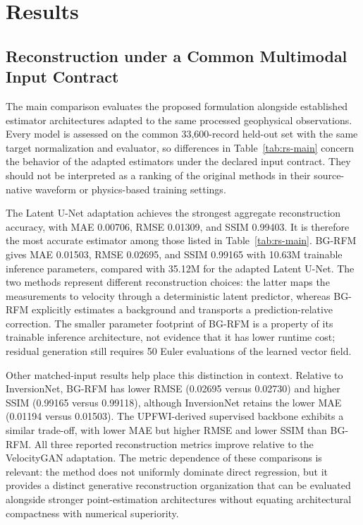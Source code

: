 \section{Results}

\subsection{Reconstruction under a Common Multimodal Input Contract}

The main comparison evaluates the proposed formulation alongside established estimator architectures adapted to the same processed geophysical observations. Every model is assessed on the common 33,600-record held-out set with the same target normalization and evaluator, so differences in Table~\ref{tab:rs-main} concern the behavior of the adapted estimators under the declared input contract. They should not be interpreted as a ranking of the original methods in their source-native waveform or physics-based training settings.



The Latent U-Net adaptation achieves the strongest aggregate reconstruction accuracy, with MAE 0.00706, RMSE 0.01309, and SSIM 0.99403. It is therefore the most accurate estimator among those listed in Table~\ref{tab:rs-main}. BG-RFM gives MAE 0.01503, RMSE 0.02695, and SSIM 0.99165 with 10.63M trainable inference parameters, compared with 35.12M for the adapted Latent U-Net. The two methods represent different reconstruction choices: the latter maps the measurements to velocity through a deterministic latent predictor, whereas BG-RFM explicitly estimates a background and transports a prediction-relative correction. The smaller parameter footprint of BG-RFM is a property of its trainable inference architecture, not evidence that it has lower runtime cost; residual generation still requires 50 Euler evaluations of the learned vector field.

Other matched-input results help place this distinction in context. Relative to InversionNet, BG-RFM has lower RMSE (0.02695 versus 0.02730) and higher SSIM (0.99165 versus 0.99118), although InversionNet retains the lower MAE (0.01194 versus 0.01503). The UPFWI-derived supervised backbone exhibits a similar trade-off, with lower MAE but higher RMSE and lower SSIM than BG-RFM. All three reported reconstruction metrics improve relative to the VelocityGAN adaptation. The metric dependence of these comparisons is relevant: the method does not uniformly dominate direct regression, but it provides a distinct generative reconstruction organization that can be evaluated alongside stronger point-estimation architectures without equating architectural compactness with numerical superiority.


